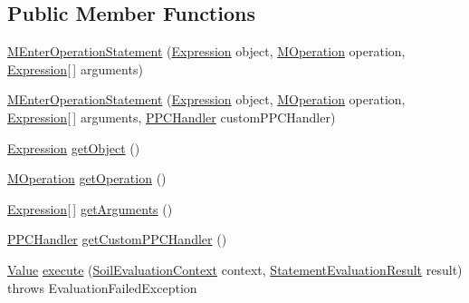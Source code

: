 \subsection*{Public Member Functions}
\begin{DoxyCompactItemize}
\item 
\hyperlink{classorg_1_1tzi_1_1use_1_1uml_1_1sys_1_1soil_1_1_m_enter_operation_statement_a58e3876c48628308f1af5cc8d52a4b3b}{M\-Enter\-Operation\-Statement} (\hyperlink{classorg_1_1tzi_1_1use_1_1uml_1_1ocl_1_1expr_1_1_expression}{Expression} object, \hyperlink{classorg_1_1tzi_1_1use_1_1uml_1_1mm_1_1_m_operation}{M\-Operation} operation, \hyperlink{classorg_1_1tzi_1_1use_1_1uml_1_1ocl_1_1expr_1_1_expression}{Expression}\mbox{[}$\,$\mbox{]} arguments)
\item 
\hyperlink{classorg_1_1tzi_1_1use_1_1uml_1_1sys_1_1soil_1_1_m_enter_operation_statement_a82eb7120b2e8d326425d47b0a48d2fc2}{M\-Enter\-Operation\-Statement} (\hyperlink{classorg_1_1tzi_1_1use_1_1uml_1_1ocl_1_1expr_1_1_expression}{Expression} object, \hyperlink{classorg_1_1tzi_1_1use_1_1uml_1_1mm_1_1_m_operation}{M\-Operation} operation, \hyperlink{classorg_1_1tzi_1_1use_1_1uml_1_1ocl_1_1expr_1_1_expression}{Expression}\mbox{[}$\,$\mbox{]} arguments, \hyperlink{interfaceorg_1_1tzi_1_1use_1_1uml_1_1sys_1_1ppc_handling_1_1_p_p_c_handler}{P\-P\-C\-Handler} custom\-P\-P\-C\-Handler)
\item 
\hyperlink{classorg_1_1tzi_1_1use_1_1uml_1_1ocl_1_1expr_1_1_expression}{Expression} \hyperlink{classorg_1_1tzi_1_1use_1_1uml_1_1sys_1_1soil_1_1_m_enter_operation_statement_afcb764575d1eb5e9cf017ef4252fb6cb}{get\-Object} ()
\item 
\hyperlink{classorg_1_1tzi_1_1use_1_1uml_1_1mm_1_1_m_operation}{M\-Operation} \hyperlink{classorg_1_1tzi_1_1use_1_1uml_1_1sys_1_1soil_1_1_m_enter_operation_statement_a0fc6b0dd59d6c7777f192abe883cc6d2}{get\-Operation} ()
\item 
\hyperlink{classorg_1_1tzi_1_1use_1_1uml_1_1ocl_1_1expr_1_1_expression}{Expression}\mbox{[}$\,$\mbox{]} \hyperlink{classorg_1_1tzi_1_1use_1_1uml_1_1sys_1_1soil_1_1_m_enter_operation_statement_a71f9274fa455d54159a049abc7ea95b7}{get\-Arguments} ()
\item 
\hyperlink{interfaceorg_1_1tzi_1_1use_1_1uml_1_1sys_1_1ppc_handling_1_1_p_p_c_handler}{P\-P\-C\-Handler} \hyperlink{classorg_1_1tzi_1_1use_1_1uml_1_1sys_1_1soil_1_1_m_enter_operation_statement_a095fe9cd3cf8a8693982aeeaffc8c44a}{get\-Custom\-P\-P\-C\-Handler} ()
\item 
\hyperlink{classorg_1_1tzi_1_1use_1_1uml_1_1ocl_1_1value_1_1_value}{Value} \hyperlink{classorg_1_1tzi_1_1use_1_1uml_1_1sys_1_1soil_1_1_m_enter_operation_statement_ad3c1355fabbe71dcc774e08e2f50dfa4}{execute} (\hyperlink{classorg_1_1tzi_1_1use_1_1uml_1_1sys_1_1soil_1_1_soil_evaluation_context}{Soil\-Evaluation\-Context} context, \hyperlink{classorg_1_1tzi_1_1use_1_1uml_1_1sys_1_1_statement_evaluation_result}{Statement\-Evaluation\-Result} result)  throws Evaluation\-Failed\-Exception 

\end{DoxyCompactItemize}
